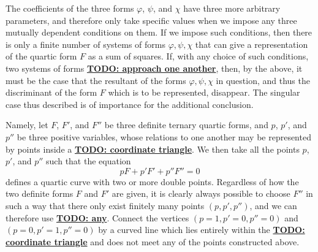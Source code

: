 \documentclass{article}
\newcommand{\unsure}[1]{\underline{\textbf{TODO: #1}}}
\newcommand{\oldpage}[1]{\marginpar{\footnotesize$\Big\vert$ \textit{p.~#1}}}
\begin{document}
The coefficients of the three forms $\varphi$, $\psi$, and $\chi$ have three more arbitrary parameters, and therefore only take specific values when we impose any three mutually dependent conditions on them.
If we impose such conditions, then there is only a finite number of systems of forms $\varphi,\psi,\chi$ that can give a representation of the quartic form $F$ as a sum of squares.
If, with any choice of such conditions, two systems of forms \unsure{approach one another}, then, by the above, it must be the case that the resultant of the forms $\varphi,\psi,\chi$ in question, and thus the discriminant of the form $F$ which is to be represented, disappear.
The singular case thus described is of importance for the additional conclusion.

Namely, let $F$, $F'$, and $F''$ be three definite ternary quartic forms, and $p$, $p'$, and $p''$ be three positive variables, whose relations to one another may be represented by points inside a \unsure{coordinate triangle}.
\oldpage{344}
We then take all the points $p$, $p'$, and $p''$ such that the equation
\[
\label{equation3}
  pF + p'F' + p''F'' = 0
\tag{3}
\]
defines a quartic curve with two or more double points.
Regardless of how the two definite forms $F$ and $F'$ are given, it is clearly always possible to choose $F''$ in such a way that there only exist finitely many points $(p,p',p'')$, and we can therefore use \unsure{any}.
Connect the vertices $(p=1,p'=0,p''=0)$ and $(p=0,p'=1,p''=0)$ by a curved line which lies entirely within the \unsure{coordinate triangle} and does not meet any of the points constructed above.
\end{document}
